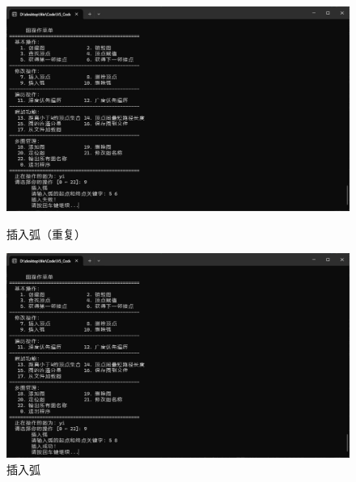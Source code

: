 \documentclass[supercite]{Experimental_Report}
\theoremstyle{definition}
\begin{document}
\begin{figure}[htb]
	\begin{center}
		\includegraphics[scale=0.30]{images/2-8.jpg}
		\caption{插入弧（重复）}
		\label{fig2-8}
	\end{center}


	\begin{center}
		\includegraphics[scale=0.30]{images/2-9.jpg}
		\caption{插入弧}
		\label{fig2-9}
	\end{center}
\end{figure}
\end{document}
